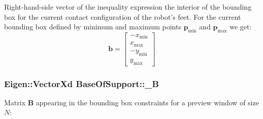 \-Right-\/hand-\/side vector of the inequality expression the interior of the bounding box for the current contact configuration of the robot's feet. \-For the current bounding box defined by minimum and maximum points $\mathbf{p}_{\text{min}}$ and $\mathbf{p}_{\text{max}}$ we get\-: \[ \mathbf{b} = \left[ \begin{array}{c} -x_{\text{min}}\\ x_{\text{max}}\\ -y_{\text{min}}\\ y_{\text{max}} \end{array} \right] \] \hypertarget{classBaseOfSupport_adfa70199064a50d9d7aea9a6d4b13246}{
\subsubsection[{\-\_\-\-B}]{\setlength{\rightskip}{0pt plus 5cm}\-Eigen\-::\-Vector\-Xd {\bf \-Base\-Of\-Support\-::\-\_\-\-B}}}\label{classBaseOfSupport_adfa70199064a50d9d7aea9a6d4b13246}
\-Matrix $\mathbf{B}$ appearing in the bounding box constraints for a preview window of size $N$\-:

